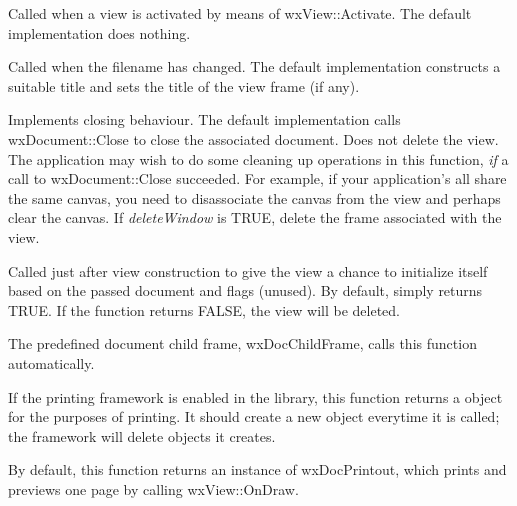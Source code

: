 

Called when a view is activated by means of wxView::Activate. The default implementation does
nothing.



Called when the filename has changed. The default implementation constructs a
suitable title and sets the title of the view frame (if any).



Implements closing behaviour. The default implementation calls wxDocument::Close
to close the associated document. Does not delete the view. The application
may wish to do some cleaning up operations in this function, {\it if} a
call to wxDocument::Close succeeded. For example, if your application's
all share the same canvas, you need to disassociate the canvas from the view
and perhaps clear the canvas. If {\it deleteWindow} is TRUE, delete the
frame associated with the view.



Called just after view construction to give the view a chance to initialize
itself based on the passed document and flags (unused). By default, simply
returns TRUE. If the function returns FALSE, the view will be deleted.

The predefined document child frame, wxDocChildFrame, calls this function
automatically.



If the printing framework is enabled in the library, this function returns a
\rtfsp{} object for the purposes of printing. It should create a new object
everytime it is called; the framework will delete objects it creates.

By default, this function returns an instance of wxDocPrintout, which prints
and previews one page by calling wxView::OnDraw.


